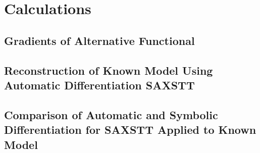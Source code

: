 
\chapter{Calculations}

\section{Gradients of Alternative Functional} %

\section{Reconstruction of Known Model Using Automatic Differentiation SAXSTT}

\section{Comparison of Automatic and Symbolic Differentiation for SAXSTT Applied to Known Model}

